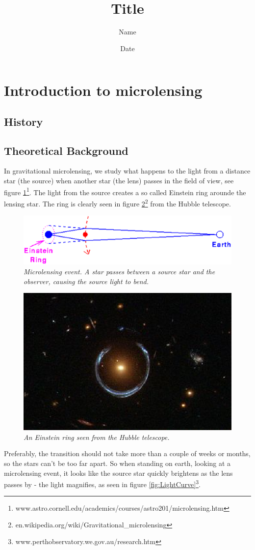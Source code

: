 \documentclass[12pt,a4paper,oneside]{scrartcl}
\title{Title}
\author{Name}
\date{Date}
\begin{document}
\section{Introduction to microlensing}
\subsection{History}
\subsection{Theoretical Background}
In gravitational microlensing, we study what happens to the light from a distance star (the source) when another star (the lens) passes in the field of view, see figure \ref{fig:Microlens_draw}\footnote{www.astro.cornell.edu/academics/courses/astro201/microlensing.htm}. The light from the source creates a so called Einstein ring arounde the lensing star. The ring is clearly seen in figure \ref{fig:EinsteinRing}\footnote{en.wikipedia.org/wiki/Gravitational\_microlensing} from the Hubble telescope.
\begin{figure}[p]
\centering
\includegraphics[width=0.7 \textwidth]{microlens_draw}
\caption{\emph{Microlensing event. A star passes between a source star and the observer, causing the source light to bend.}}\label{fig:Microlens_draw}
\end{figure}
\begin{figure}[p]
\centering
\includegraphics[width=0.3 \textwidth]{Wiki_A_Horseshoe_Einstein_Ring_from_Hubble}
\caption{\emph{An Einstein ring seen from the Hubble telescope.}\label{fig:EinsteinRing}}
\end{figure}

Preferably, the transition should not take more than a couple of weeks or months, so the stars can't be too far apart. So when standing on earth, looking at a microlensing event, it looks like the source star quickly brightens as the lens passes by - the light magnifies, as seen in figure \ref{fig:LightCurve}\footnote{www.perthobservatory.we.gov.au/research.htm}. 
\end{document}
